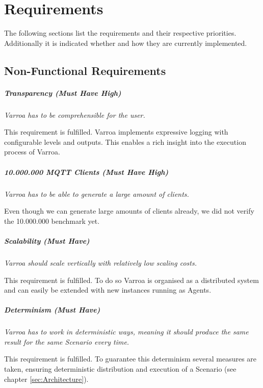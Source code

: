 \chapter{Requirements}
The following sections list the requirements and their respective priorities.
Additionally it is indicated whether and how they are currently implemented.

\section{Non-Functional Requirements}

\paragraph{Transparency (Must Have High)}
\emph{Varroa has to be comprehensible for the user.}

This requirement is fulfilled.
Varroa implements expressive logging with configurable levels and outputs.
This enables a rich insight into the execution process of Varroa.

\paragraph{10.000.000 MQTT Clients (Must Have High)} 
\emph{Varroa has to be able to generate a large amount of clients.}

Even though we can generate large amounts of clients already, we did not verify the 10.000.000 benchmark yet.

\paragraph{Scalability (Must Have)} 
\emph{Varroa should scale vertically with relatively low scaling costs.}

This requirement is fulfilled.
To do so Varroa is organised as a distributed system and can easily be extended with new instances running as Agents.

\paragraph{Determinism (Must Have)} 
\emph{Varroa has to work in deterministic ways, meaning it should produce the same result for the same Scenario every time.}

This requirement is fulfilled.
To guarantee this determinism several measures are taken, ensuring deterministic distribution and execution of a Scenario (see chapter \ref{sec:Architecture}).

